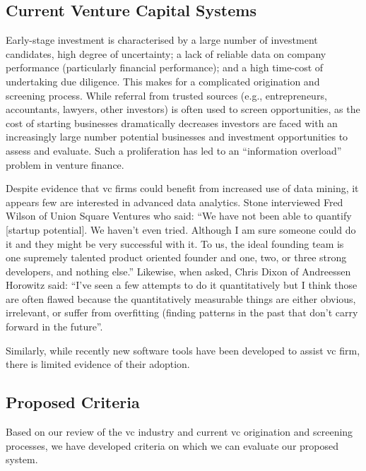 \documentclass[../thesis/thesis.tex]{subfiles}
\begin{document}
\subsection{Current Venture Capital Systems}

Early-stage investment is characterised by a large number of investment candidates, high degree of uncertainty; a lack of reliable data on company performance (particularly financial performance); and a high time-cost of undertaking due diligence. This makes for a complicated origination and screening process. While referral from trusted sources (e.g., entrepreneurs, accountants, lawyers, other investors) is often used to screen opportunities, as the cost of starting businesses dramatically decreases investors are faced with an increasingly large number potential businesses and investment opportunities to assess and evaluate. Such a proliferation has led to an “information overload” problem in venture finance.

Despite evidence that \gls{vc} firms could benefit from increased use of data mining, it appears few are interested in advanced data analytics. Stone \cite{stone2014} interviewed Fred Wilson of Union Square Ventures who said: ``We have not been able to quantify [startup potential]. We haven’t even tried. Although I am sure someone could do it and they might be very successful with it. To us, the ideal founding team is one supremely talented product oriented founder and one, two, or three strong developers, and nothing else.'' Likewise, when asked, Chris Dixon of Andreessen Horowitz said: ``I’ve seen a few attempts to do it quantitatively but I think those are often flawed because the quantitatively measurable things are either obvious, irrelevant, or suffer from overfitting (finding patterns in the past that don’t carry forward in the future''.

Similarly, while recently new software tools have been developed to assist \gls{vc} firm, there is limited evidence of their adoption. %

\subsection{Proposed Criteria}

Based on our review of the \gls{vc} industry and current \gls{vc} origination and screening processes, we have developed criteria on which we can evaluate our proposed system.
\end{document}
